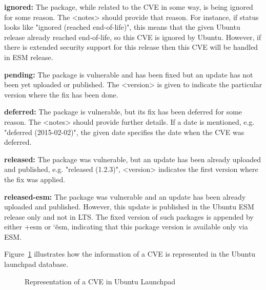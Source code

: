\documentclass[a4paper,num-refs]{oup-contemporary}
\begin{document}
\textbf{ignored:} The package, while related to the
		CVE in some way, is being ignored for some reason. The
		<notes> should provide that reason. For instance, if status looks like
		"ignored (reached end-of-life)", this means that the given Ubuntu release already reached
		end-of-life, so this CVE is ignored by Ubuntu. However, if there
		is extended security support for this release then this
		CVE will be handled in ESM release.

\textbf{pending:} The package is vulnerable and
                  has been fixed but an update has not been yet uploaded or
		  published. The <version> is given to indicate the particular 
		  version where the fix has been done.

\textbf{deferred:} The package is vulnerable, but 
                   its fix has been deferred for some reason. The <notes>
		   should provide further details. If a date is mentioned, e.g.
		   "deferred (2015-02-02)", the given date specifies the date when
		   the CVE was deferred.

\textbf{released:} The package was vulnerable, but
		an update has been already uploaded and published, e.g. "released (1.2.3)",
		<version> indicates the first version where the fix was applied.

\textbf{released-esm:} The package was vulnerable and
		an update has been already uploaded and published. However,
		this update is published in the Ubuntu ESM release only and not in LTS.
		The fixed version of such packages is appended by either
		+esm or \char`\~esm, indicating that this package version is available
		only via ESM.

Figure~\ref{example} illustrates how the information of a CVE is represented
in the Ubuntu launchpad database.

\begin{figure}[!ht]
        \caption{\label{example} Representation of a CVE in Ubuntu Launchpad}
\end{figure}
\end{document}
